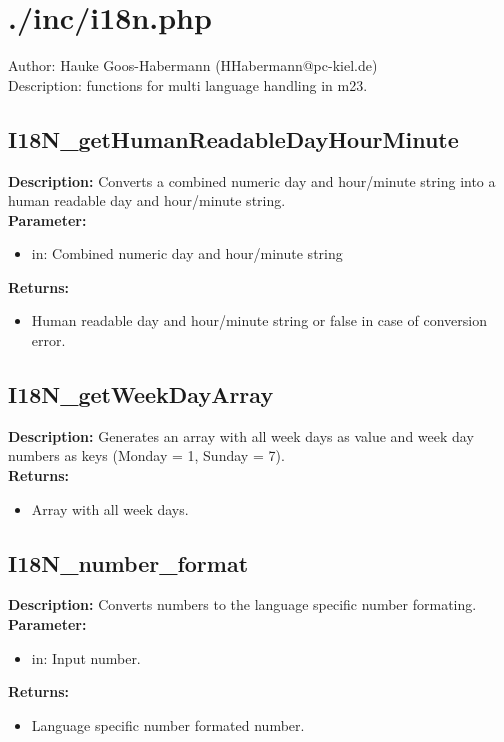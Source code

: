 \newpage\section{./inc/i18n.php}
 Author: Hauke Goos-Habermann (HHabermann@pc-kiel.de)\\
 Description: functions for multi language handling in m23.\\

\subsection{I18N\_getHumanReadableDayHourMinute}
\textbf{Description:} Converts a combined numeric day and hour/minute string into a human readable day and hour/minute string.\\
\textbf{Parameter:}
\begin{itemize}
\item in: Combined numeric day and hour/minute string
\end{itemize}
\textbf{Returns:}
\begin{itemize}
\item Human readable day and hour/minute string or false in case of conversion error.
\end{itemize}

\subsection{I18N\_getWeekDayArray}
\textbf{Description:} Generates an array with all week days as value and week day numbers as keys (Monday = 1, Sunday = 7).\\
\textbf{Returns:}
\begin{itemize}
\item Array with all week days.
\end{itemize}

\subsection{I18N\_number\_format}
\textbf{Description:} Converts numbers to the language specific number formating.\\
\textbf{Parameter:}
\begin{itemize}
\item in: Input number.
\end{itemize}
\textbf{Returns:}
\begin{itemize}
\item Language specific number formated number.
\end{itemize}

